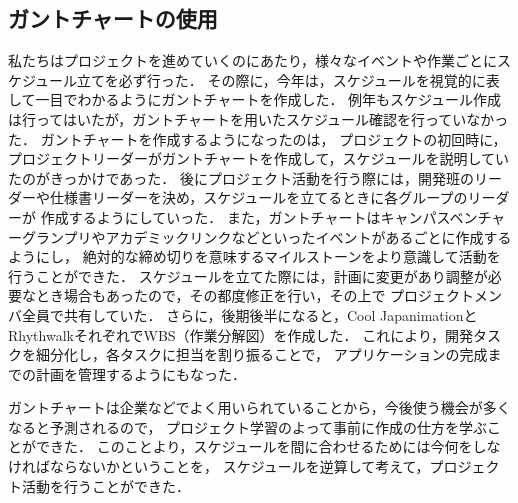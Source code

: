 \subsection{ガントチャートの使用}
\par
私たちはプロジェクトを進めていくのにあたり，様々なイベントや作業ごとにスケジュール立てを必ず行った．
その際に，今年は，スケジュールを視覚的に表して一目でわかるようにガントチャートを作成した．
例年もスケジュール作成は行ってはいたが，ガントチャートを用いたスケジュール確認を行っていなかった．
ガントチャートを作成するようになったのは，
プロジェクトの初回時に，プロジェクトリーダーがガントチャートを作成して，スケジュールを説明していたのがきっかけであった．
後にプロジェクト活動を行う際には，開発班のリーダーや仕様書リーダーを決め，スケジュールを立てるときに各グループのリーダーが
作成するようにしていった．
また，ガントチャートはキャンパスベンチャーグランプリやアカデミックリンクなどといったイベントがあるごとに作成するようにし，
絶対的な締め切りを意味するマイルストーンをより意識して活動を行うことができた．
スケジュールを立てた際には，計画に変更があり調整が必要なとき場合もあったので，その都度修正を行い，その上で
プロジェクトメンバ全員で共有していた．
さらに，後期後半になると，Cool JapanimationとRhythwalkそれぞれでWBS（作業分解図）を作成した．
これにより，開発タスクを細分化し，各タスクに担当を割り振ることで，
アプリケーションの完成までの計画を管理するようにもなった．
\par
ガントチャートは企業などでよく用いられていることから，今後使う機会が多くなると予測されるので，
プロジェクト学習のよって事前に作成の仕方を学ぶことができた．
このことより，スケジュールを間に合わせるためには今何をしなければならないかということを，
スケジュールを逆算して考えて，プロジェクト活動を行うことができた．
